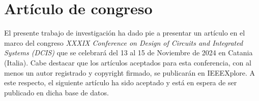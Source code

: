 
\chapter{Artículo de congreso} %

\label{Articulo} %

El presente trabajo de investigación ha dado pie a presentar un artículo en el marco del congreso \textit{XXXIX Conference on Design of Circuits and Integrated Systems (DCIS)} que se celebrará del 13 al 15 de Noviembre de 2024 en Catania (Italia).
Cabe destacar que los artículos aceptados para esta conferencia, con al menos un autor registrado y copyright firmado, se publicarán en IEEEXplore.
A este respecto, el siguiente artículo ha sido aceptado y está en espera de ser publicado en dicha base de datos.


%
